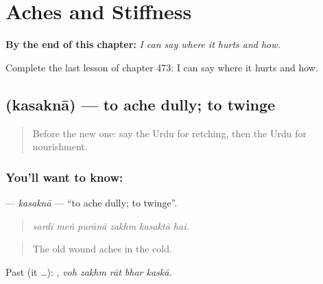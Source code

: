 
\chapter{Aches and Stiffness}
\label{ch:ur-aches-and-stiffness}

\begin{chapteropening}
\textbf{By the end of this chapter:} \emph{I can say where it hurts and how.}

Complete the last lesson of chapter 473: I can say where it hurts and how.
\end{chapteropening}

\section[\texorpdfstring{\ur{کسکنا} (kasaknā)}{کسکنا (kasaknā)}]{ (kasaknā) — to ache dully; to twinge}

\label{lesson:UR-C473-kasakna}



\begin{quote}
Before the new one: say the Urdu for retching, then the Urdu for nourishment.
\end{quote}

\subsection*{You'll want to know: }
\textbf{} — \emph{kasaknā} — \textquotedblleft{}to ache dully; to twinge\textquotedblright{}.

\begin{quote}
     
\end{quote}

\begin{quote}
\emph{sardī meṅ purānā zakhm kasaktā hai.}
\end{quote}

\begin{quote}
The old wound aches in the cold.
\end{quote}

Past (it …):     , \emph{voh zakhm rāt bhar kaskā}.

